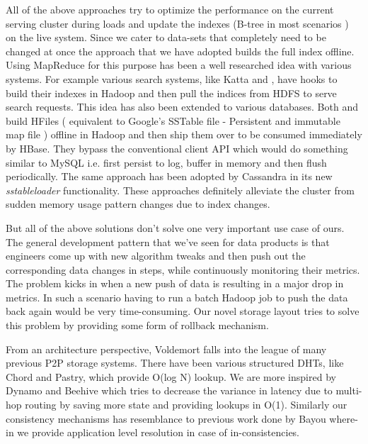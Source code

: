 \documentclass[10pt,twocolumn,preprint,natbib,authoryear]{sigplanconf}
\begin{document}
All of the above approaches try to optimize the performance on the current serving cluster during loads and update the indexes (B-tree in most scenarios ) on the live system. Since we cater to data-sets that completely need to be changed at once the approach that we have adopted builds the full index offline. Using MapReduce for this purpose has been a well researched idea with various systems. For example various search systems, like Katta\cite{10 - Katta link} and \cite{Distributed Indexing for Semantic Search}, have hooks to build their indexes in Hadoop and then pull the indices from HDFS to serve search requests. This idea has also been extended to various databases. Both \cite{11 - Distributed Indexing of Web Scale Datasets for the Cloud} and \cite{Parallel Bulk Insertion for Large-scale Analytics Applications} build HFiles ( equivalent to Google's SSTable file - Persistent and immutable map file ) offline in Hadoop and then ship them over to be consumed immediately by HBase. They bypass the conventional client API which would do something similar to MySQL i.e. first persist to log, buffer in memory and then flush periodically. The same approach has been adopted by Cassandra in its new \emph{sstableloader}\cite{http://www.datastax.com/dev/blog/bulk-loading} functionality. These approaches definitely alleviate the cluster from sudden memory usage pattern changes due to index changes. 

But all of the above solutions don't solve one very important use case of ours. The general development pattern that we've seen for data products is that engineers come up with new algorithm tweaks and then push out the corresponding data changes in steps, while continuously monitoring their metrics. The problem kicks in when a new push of data is resulting in a major drop in metrics. In such a scenario having to run a batch Hadoop job to push the data back again would be very time-consuming. Our novel storage layout tries to solve this problem by providing some form of rollback mechanism. 
 
From an architecture perspective, Voldemort falls into the league of many previous P2P storage systems. There have been various structured DHTs, like Chord and Pastry, which provide O(log N) lookup. We are more inspired by Dynamo and Beehive which tries to decrease the variance in latency due to multi-hop routing by saving more state and providing lookups in O(1). Similarly our consistency mechanisms has resemblance to previous work done by Bayou\cite{http://www2.parc.com/csl/projects/bayou/pubs/uist-97/Bayou.pdf} where-in we provide application level resolution in case of in-consistencies. 
\end{document}
